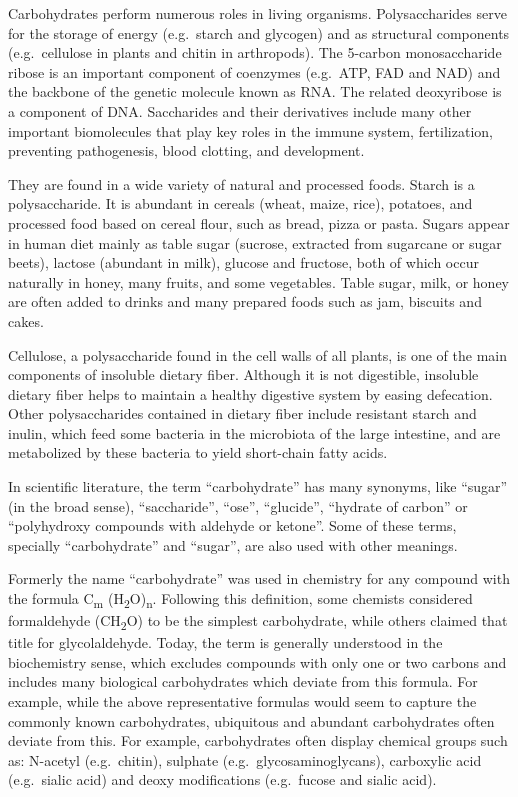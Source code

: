 Carbohydrates perform numerous roles in living organisms. Polysaccharides serve for the storage of energy (e.g.~starch and glycogen) and as structural components (e.g.~cellulose in plants and chitin in arthropods). The 5-carbon monosaccharide ribose is an important component of coenzymes (e.g.~ATP, FAD and NAD) and the backbone of the genetic molecule known as RNA. The related deoxyribose is a component of DNA. Saccharides and their derivatives include many other important biomolecules that play key roles in the immune system, fertilization, preventing pathogenesis, blood clotting, and development.

They are found in a wide variety of natural and processed foods. Starch is a polysaccharide. It is abundant in cereals (wheat, maize, rice), potatoes, and processed food based on cereal flour, such as bread, pizza or pasta. Sugars appear in human diet mainly as table sugar (sucrose, extracted from sugarcane or sugar beets), lactose (abundant in milk), glucose and fructose, both of which occur naturally in honey, many fruits, and some vegetables. Table sugar, milk, or honey are often added to drinks and many prepared foods such as jam, biscuits and cakes.

Cellulose, a polysaccharide found in the cell walls of all plants, is one of the main components of insoluble dietary fiber. Although it is not digestible, insoluble dietary fiber helps to maintain a healthy digestive system by easing defecation. Other polysaccharides contained in dietary fiber include resistant starch and inulin, which feed some bacteria in the microbiota of the large intestine, and are metabolized by these bacteria to yield short-chain fatty acids.

In scientific literature, the term ``carbohydrate'' has many synonyms, like ``sugar'' (in the broad sense), ``saccharide'', ``ose'', ``glucide'', ``hydrate of carbon'' or ``polyhydroxy compounds with aldehyde or ketone''. Some of these terms, specially ``carbohydrate'' and ``sugar'', are also used with other meanings.

Formerly the name ``carbohydrate'' was used in chemistry for any compound with the formula C\textsubscript{m} (H\textsubscript{2}O)\textsubscript{n}. Following this definition, some chemists considered formaldehyde (CH\textsubscript{2}O) to be the simplest carbohydrate, while others claimed that title for glycolaldehyde. Today, the term is generally understood in the biochemistry sense, which excludes compounds with only one or two carbons and includes many biological carbohydrates which deviate from this formula. For example, while the above representative formulas would seem to capture the commonly known carbohydrates, ubiquitous and abundant carbohydrates often deviate from this. For example, carbohydrates often display chemical groups such as: N-acetyl (e.g.~chitin), sulphate (e.g.~glycosaminoglycans), carboxylic acid (e.g.~sialic acid) and deoxy modifications (e.g.~fucose and sialic acid).

